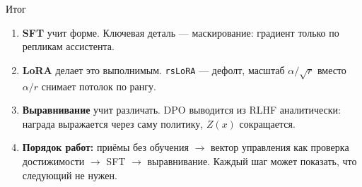 \documentclass[11pt,aspectratio=169]{beamer}
\begin{document}
\begin{frame}{Итог}

\begin{enumerate}\setlength{\itemsep}{0.7em}
\item \textbf{SFT} учит форме. Ключевая деталь — маскирование: градиент
только по репликам ассистента.

\item \textbf{LoRA} делает это выполнимым. \texttt{rsLoRA} — дефолт,
масштаб $\alpha/\sqrt{r}$ вместо $\alpha/r$ снимает потолок по рангу.

\item \textbf{Выравнивание} учит различать. DPO выводится из RLHF
аналитически: награда выражается через саму политику, $Z(x)$
сокращается.

\item \textbf{Порядок работ:} приёмы без обучения $\to$ вектор
управления как проверка достижимости $\to$ SFT $\to$ выравнивание.
Каждый шаг может показать, что следующий не нужен.
\end{enumerate}

\end{frame}
\end{document}

